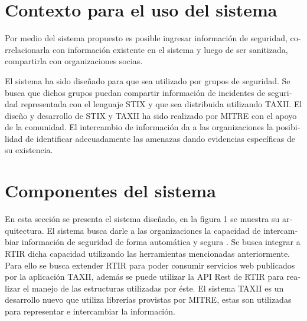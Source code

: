 \documentclass[11pt]{article}
\begin{document}
\section[Contexto para el uso del sistema]{\foreignlanguage{spanish}{Contexto para el uso del sistema}}
\foreignlanguage{spanish}{Por medio del sistema propuesto es posible ingresar información de seguridad, correlacionarla
con información existente en el sistema y luego de ser sanitizada, compartirla con organizaciones socias.}


\bigskip

\foreignlanguage{spanish}{El sistema ha sido diseñado para que sea utilizado por grupos de seguridad. Se busca que
dichos grupos puedan compartir información de incidentes de seguridad representada con el lenguaje STIX y que sea
distribuida utilizando TAXII. El diseño y desarrollo de STIX y TAXII ha sido realizado por MITRE con el apoyo de la
comunidad. El intercambio de información da a las organizaciones la posibilidad de identificar adecuadamente las
amenazas dando evidencias específicas de su existencia.}

%
%


\section[Componentes del sistema]{\foreignlanguage{spanish}{Componentes del sistema}}

\bigskip

\foreignlanguage{spanish}{En esta sección se presenta el sistema diseñado, en la figura 1 se muestra su arquitectura. El
sistema busca darle a las organizaciones la capacidad de intercambiar información de seguridad de forma automática y
segura}%
%
\foreignlanguage{spanish}{. Se busca integrar a RTIR dicha capacidad utilizando las herramientas mencionadas
anteriormente. Para ello se busca extender RTIR para poder consumir servicios web publicados por la aplicación TAXII,
además se puede utilizar la API Rest de RTIR para realizar el manejo de las estructuras utilizadas por éste. El sistema
TAXII es un desarrollo nuevo que utiliza librerías provistas por MITRE, estas son utilizadas para representar e
intercambiar la información.}
\end{document}
